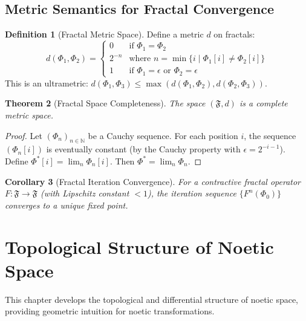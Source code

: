 \documentclass[11pt,twoside,openright]{book}
\theoremstyle{definition}
\newtheorem{definition}{Definition}[chapter]
\theoremstyle{plain}
\newtheorem{theorem}[definition]{Theorem}
\newtheorem{corollary}[definition]{Corollary}
\theoremstyle{remark}
\newcommand{\Frac}{\Phi}
\newcommand{\FracSet}{\mathfrak{F}}
\newcommand{\vnewone}{\textbf{v7.1 New}}
\begin{document}
\section{Metric Semantics for Fractal Convergence}

\begin{definition}[Fractal Metric Space]
\label{def:fractal-metric}
Define a metric $d$ on fractals:
\[
d(\Frac_1, \Frac_2) =
\begin{cases}
0 & \text{if } \Frac_1 = \Frac_2 \\
2^{-n} & \text{where } n = \min\{i \mid \Frac_1[i] \neq \Frac_2[i]\} \\
1 & \text{if } \Frac_1 = \epsilon \text{ or } \Frac_2 = \epsilon
\end{cases}
\]
This is an ultrametric: $d(\Frac_1, \Frac_3) \leq \max(d(\Frac_1, \Frac_2), d(\Frac_2, \Frac_3))$.
\end{definition}

\begin{theorem}[Fractal Space Completeness]
\label{thm:fractal-complete}
The space $(\FracSet, d)$ is a complete metric space.
\end{theorem}

\begin{proof}
Let $(\Frac_n)_{n \in \mathbb{N}}$ be a Cauchy sequence. For each position $i$, the sequence $(\Frac_n[i])$ is eventually constant (by the Cauchy property with $\epsilon = 2^{-i-1}$). Define $\Frac^*[i] = \lim_n \Frac_n[i]$. Then $\Frac^* = \lim_n \Frac_n$.
\end{proof}

\begin{corollary}[Fractal Iteration Convergence]
\label{cor:fractal-convergence}
For a contractive fractal operator $F : \FracSet \to \FracSet$ (with Lipschitz constant $< 1$), the iteration sequence $\{F^n(\Frac_0)\}$ converges to a unique fixed point.
\end{corollary}


\chapter{Topological Structure of Noetic Space}
\label{ch:noetic-topology}

\begin{tcolorbox}[colback=blue!5!white,colframe=blue!75!black,title=\vnewone]
This chapter develops the topological and differential structure of noetic space, providing geometric intuition for noetic transformations.
\end{tcolorbox}
\end{document}
